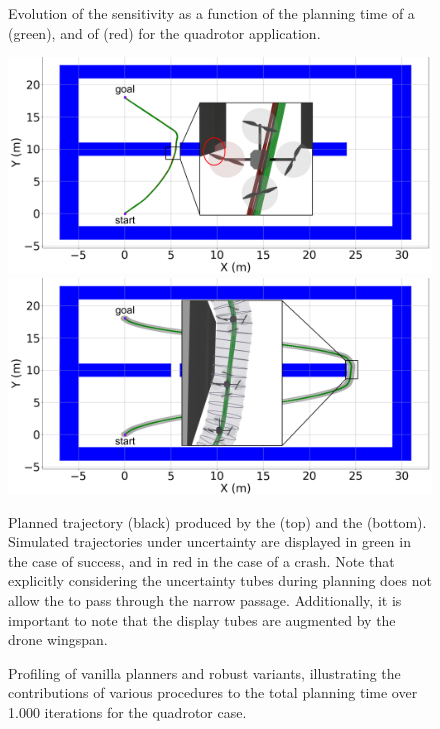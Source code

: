 \begin{figure} [H]
    \centering
     
    \caption{Evolution of the sensitivity as a function of the planning time of a  (green), and of  (red) for the quadrotor application.}%
    \label{fig:samp_quad_time}%
\end{figure}

\begin{figure} [H]
    \centering
    \includegraphics[width=0.8\linewidth]{figures/samp/non_robust_quad.png}
    \includegraphics[width=0.8\linewidth]{figures/samp/robust_quad.png}
    \caption{Planned trajectory (black) produced by the  (top) and the  (bottom). 
    Simulated trajectories under uncertainty are displayed in green in the case of success, and in red in the case of a crash.
    Note that explicitly considering the uncertainty tubes during planning does not allow the  to pass through the narrow passage.
    Additionally, it is important to note that the display tubes are augmented by the drone wingspan.}%
    \label{fig:robust_quad}%
\end{figure}

\begin{figure} [H]
    \centering
     
    \caption{Profiling of vanilla planners and robust variants, illustrating the contributions of various procedures to the total planning time over 1.000 iterations for the quadrotor case.
    }%
    \label{fig:profiling_quad}%
\end{figure}

